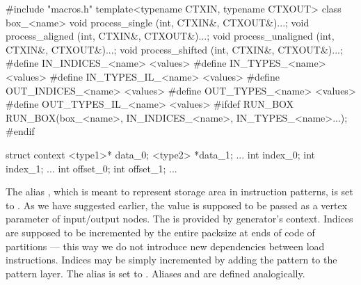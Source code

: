 \mybeginfig
\begin{code}
#include "macros.h"
template<typename CTXIN, typename CTXOUT>
class box_<name>
{
  void process_single    (int, CTXIN&, CTXOUT&){...};
  void process_aligned   (int, CTXIN&, CTXOUT&){...};
  void process_unaligned (int, CTXIN&, CTXOUT&){...};
  void process_shifted   (int, CTXIN&, CTXOUT&){...};
}
#define IN_INDICES_<name> <values>
#define IN_TYPES_<name> <values>
#define IN_TYPES_IL_<name> <values>
#define OUT_INDICES_<name> <values>
#define OUT_TYPES_<name> <values>
#define OUT_TYPES_IL_<name> <values>
#ifdef RUN_BOX
  RUN_BOX(box_<name>, IN_INDICES_<name>, IN_TYPES_<name>...);
#endif

\end{code}


\mybeginfig
\begin{code}
struct context
{
  <type1>* data_0; <type2> *data_1; ...
  int index_0;     int index_1;  ...
  int offset_0;    int offset_1; ...
}
\end{code}


    The alias , which is meant to represent storage area in instruction patterns, is set to . As we have suggested earlier, the  value is supposed to be passed as a vertex parameter of input/output nodes. The  is provided by generator's context. Indices are supposed to be incremented by the entire packsize at ends of code of partitions --- this way we do not introduce new dependencies between load instructions. Indices may be simply incremented by adding the  pattern to the  pattern layer. The alias  is set to . Aliases  and  are defined analogically.

